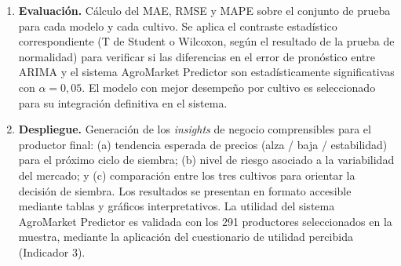\documentclass[12pt, a4paper]{report}
\begin{document}
\begin{enumerate}[label=\textbf{\arabic*.}, leftmargin=2cm]
\begin{itemize}
    \item \textbf{Prophet:} Configuración del modelo con componentes de tendencia lineal o logística, estacionalidad anual (Fourier), estacionalidad mensual y ventanas de puntos de cambio (\textit{changepoints}) alineadas con los periodos de campaña agrícola. El modelo se entrena con la biblioteca \texttt{prophet} de Meta y se aprovecha su robustez intrínseca ante valores atípicos y datos faltantes.
  \end{itemize}

  Ambos modelos son entrenados de forma independiente para cada cultivo, garantizando que las particularidades estacionales y de volatilidad propias de la papa, el arroz y el maíz sean capturadas de manera adecuada.

  \item \textbf{Evaluación.}
  Cálculo del MAE, RMSE y MAPE sobre el conjunto de prueba para cada modelo y cada cultivo. Se aplica el contraste estadístico correspondiente (T de Student o Wilcoxon, según el resultado de la prueba de normalidad) para verificar si las diferencias en el error de pronóstico entre ARIMA y el sistema AgroMarket Predictor son estadísticamente significativas con $\alpha = 0{,}05$. El modelo con mejor desempeño por cultivo es seleccionado para su integración definitiva en el sistema.

  \item \textbf{Despliegue.}
  Generación de los \textit{insights} de negocio comprensibles para el productor final: (a) tendencia esperada de precios (alza / baja / estabilidad) para el próximo ciclo de siembra; (b) nivel de riesgo asociado a la variabilidad del mercado; y (c) comparación entre los tres cultivos para orientar la decisión de siembra. Los resultados se presentan en formato accesible mediante tablas y gráficos interpretativos. La utilidad del sistema AgroMarket Predictor es validada con los 291 productores seleccionados en la muestra, mediante la aplicación del cuestionario de utilidad percibida (Indicador 3).

\end{enumerate}
\end{document}
